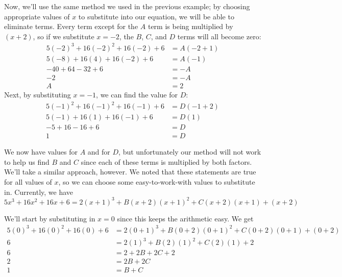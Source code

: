 {Now, we'll use the same method we used in the previous example; by choosing appropriate values of $x$ to substitute into our equation, we will be able to eliminate terms. Every term except for the $A$ term is being multiplied by $(x+2)$, so if we substitute $x=-2$, the $B$, $C$, and $D$ terms will all become zero:
\begin{equation*}
	\begin{split}
		5(-2)^3 + 16(-2)^2 + 16(-2) + 6 & = A(-2+1) \\
		5(-8) + 16(4) +16(-2) + 6 & = A(-1) \\
		-40+64-32+6 &= -A \\
		-2 & = -A \\
		A &= 2
	\end{split}
\end{equation*}
\drawexampleline
Next, by substituting $x=-1$, we can find the value for $D$:
\begin{equation*}
	\begin{split}
		5(-1)^2+16(-1)^2 + 16(-1)+6 & = D(-1+2) \\
		5(-1) + 16(1) + 16(-1) + 6 &= D(1) \\
		-5+16-16+6 & = D \\
		1 & = D
	\end{split}
\end{equation*}

We now have values for $A$ and for $D$, but unfortunately our method will not work to help us find $B$ and $C$ since each of these terms is multiplied by both factors. We'll take a similar approach, however. We noted that these statements are true for all values of $x$, so we can choose some easy-to-work-with values to substitute in. Currently, we have
\begin{equation*}
	5x^3+16x^2+16x+6 = 2(x+1)^3 + B(x+2)(x+1)^2 + C(x+2)(x+1) + (x+2)
\end{equation*}

\noindent
We'll start by substituting in $x=0$ since this keeps the arithmetic easy. We get
\begin{equation*}
	\begin{split}
		5(0)^3 + 16(0)^2 + 16(0) + 6 &= 2(0+1)^3 + B(0+2)(0+1)^2 + C(0+2)(0+1) + (0+2) \\
		6 & = 2(1)^3 + B(2)(1)^2 + C(2)(1) + 2 \\
		6 & = 2 +2B + 2C + 2 \\
		2 &= 2B + 2C \\
		1 & = B + C
	\end{split}
\end{equation*}

}
